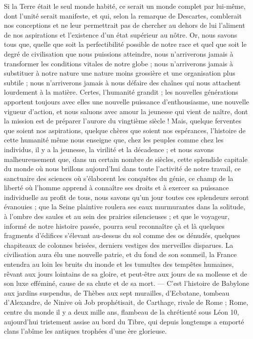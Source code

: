 \documentclass[a4paper, 11pt, oneside, landscape]{article}
\begin{document}
Si la Terre était le seul monde habité, ce serait un monde complet par lui-même, dont l'unité serait manifeste, et qui, selon la remarque de Descartes, comblerait nos conceptions et ne leur permettrait pas de chercher au dehors de lui l'aliment de nos aspirations et l'existence d'un état supérieur au nôtre. Or, nous savons tous que, quelle que soit la perfectibilité possible de notre race et quel que soit le degré de civilisation que nous puissions atteindre, nous n'arriverons jamais à transformer les conditions vitales de notre globe ; nous n'arriverons jamais à substituer à notre nature une nature moins grossière et une organisation plus subtile ; nous n'arriverons jamais à nous défaire des chaînes qui nous attachent lourdement à la matière. Certes, l'humanité grandit ; les nouvelles générations apportent toujours avec elles une nouvelle puissance d'enthousiasme, une nouvelle vigueur d'action, et nous saluons avec amour la jeunesse qui vient de naître, dont la mission est de préparer l'aurore du vingtième siècle ! Mais, quelque ferventes que soient nos aspirations, quelque chères que soient nos espérances, l'histoire de cette humanité même nous enseigne que, chez les peuples comme chez les individus, il y a la jeunesse, la virilité et la décadence ; et nous savons malheureusement que, dans un certain nombre de siècles, cette splendide capitale du monde où nous brillons aujourd'hui dans toute l'activité de notre travail, ce sanctuaire des sciences où s'élaborent les conquêtes du génie, ce champ de la liberté où l'homme apprend à connaître ses droits et à exercer sa puissance individuelle au profit de tous, nous savons qu'un jour toutes ces splendeurs seront évanouies ; que la Seine plaintive roulera ses eaux murmurantes dans la solitude, à l'ombre des saules et au sein des prairies silencieuses ; et que le voyageur, informé de notre histoire passée, pourra seul reconnaître çà et là quelques fragments d'édifices s'élevant au-dessus du sol comme des os dénudés, quelques chapiteaux de colonnes brisées, derniers vestiges des merveilles disparues. La civilisation aura élu une nouvelle patrie, et du fond de son sommeil, la France entendra au loin les bruits du inonde et les tumultes des tempêtes humaines, rêvant aux jours lointains de sa gloire, et peut-être aux jours de sa mollesse et de son luxe efféminé, cause de sa chute et de sa mort. --- C'est l'histoire de Babylone aux jardins suspendus, de Thèbes aux sept murailles, d'Ecbatane, tombeau d'Alexandre, de Ninive où Job prophétisait, de Carthage, rivale de Rome ; Rome, centre du monde il y a deux mille ans, flambeau de la chrétienté sous Léon 10, aujourd'hui tristement assise au bord du Tibre, qui depuis longtemps a emporté clans l'abîme les antiques trophées d'une ère glorieuse.
\end{document}
